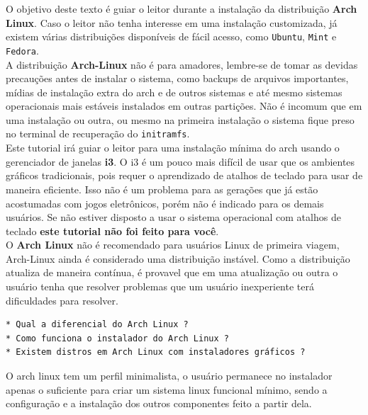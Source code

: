 \documentclass[12pt,a4paper]{article}
\begin{document}
\hspace{\baselineskip}

O objetivo deste texto é guiar o leitor durante a instalação da distribuição \textbf{Arch Linux}. Caso o leitor não tenha interesse em uma instalação customizada, já existem várias distribuições disponíveis de fácil acesso, como \texttt{Ubuntu}, \texttt{Mint} e \texttt{Fedora}. \\

A distribuição \textbf{Arch-Linux} não é para amadores, lembre-se de tomar as devidas precauções antes de instalar o sistema, como backups de arquivos importantes, mídias de instalação extra do arch e de outros sistemas e até mesmo sistemas operacionais mais estáveis instalados em outras partições. Não é incomum que em uma instalação ou outra, ou mesmo na primeira instalação o sistema fique preso no terminal de recuperação do \texttt{initramfs}. \\

Este tutorial irá guiar o leitor para uma instalação mínima do arch usando o gerenciador de janelas \textbf{i3}. O i3 é um pouco mais difícil de usar que os ambientes gráficos tradicionais, pois requer o aprendizado de atalhos de teclado para usar de maneira eficiente. Isso não é um problema para as gerações que já estão acostumadas com jogos eletrônicos, porém não é indicado para os demais usuários. Se não estiver disposto a usar o sistema operacional com atalhos de teclado \textbf{este tutorial não foi feito para você}.\\

O \textbf{Arch Linux} não é recomendado para usuários Linux de primeira viagem, Arch-Linux ainda é considerado uma distribuição instável. Como a distribuição atualiza de maneira contínua, é provavel que em uma atualização ou outra o usuário tenha que resolver problemas que um usuário inexperiente terá dificuldades para resolver. \\

\begin{lstlisting}
* Qual a diferencial do Arch Linux ?
* Como funciona o instalador do Arch Linux ? 
* Existem distros em Arch Linux com instaladores gráficos ? 
\end{lstlisting}

\vspace{\baselineskip}

O arch linux tem um perfil minimalista, o usuário permanece no instalador apenas o suficiente para criar um sistema linux funcional mínimo, sendo a configuração e a instalação dos outros componentes feito a partir dela.\\
\end{document}
